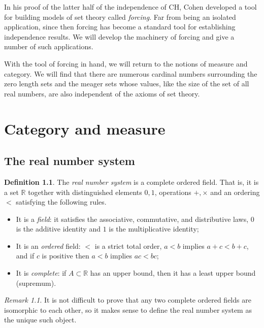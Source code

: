 \documentclass[11pt,oneside]{amsbook}
\newcommand{\RR}{\mathbb R}
\theoremstyle{definition}
\theoremstyle{plain}
\theoremstyle{definition}
\newtheorem{defn}[thm]{Definition}
\theoremstyle{remark}
\newtheorem{rem}[thm]{Remark}
\numberwithin{equation}{section}
\numberwithin{figure}{section}
\begin{document}
In his proof of the latter half of the independence of CH, Cohen developed a tool for building models of set theory called \emph{forcing}. Far from being an isolated application, since then forcing has become a standard tool for establishing independence results. We will develop the machinery of forcing and give a number of such applications.

With the tool of forcing in hand, we will return to the notions of measure and category. We will find that there are numerous cardinal numbers surrounding the zero length sets and the meager sets whose values, like the size of the set of all real numbers, are also independent of the axioms of set theory.


\chapter{Category and measure}

\section{The real number system}

\begin{defn}
  The \emph{real number system} is a complete ordered field. That is, it is a set $\RR$ together with distinguished elements $0,1$, operations $+,\times$ and an ordering $<$ satisfying the following rules.
\begin{itemize}
\item It is a \emph{field}: it satisfies the associative, commutative, and distributive laws, $0$ is the additive identity and $1$ is the multiplicative identity;
\item It is an \emph{ordered} field: $<$ is a strict total order, $a<b$ implies $a+c<b+c$, and if $c$ is positive then $a<b$ implies $ac<bc$;
\item It is \emph{complete}: if $A\subset\RR$ has an upper bound, then it has a least upper bound (supremum).
\end{itemize}
\end{defn}

\begin{rem}
  It is not difficult to prove that any two complete ordered fields are isomorphic to each other, so it makes sense to define the real number system as the unique such object.
\end{rem}
\end{document}
